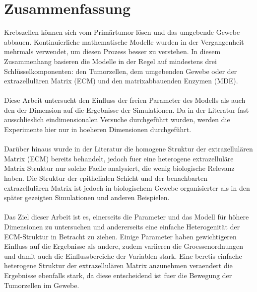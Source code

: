 \section*{Zusammenfassung}

Krebszellen können sich vom Primärtumor lösen und das umgebende Gewebe abbauen. 
Kontinuierliche mathematische Modelle wurden in der Vergangenheit mehrmals verwendet, um diesen Prozess besser zu verstehen. In diesem Zusammenhang basieren die Modelle in der Regel auf mindestens drei Schlüsselkomponenten: den Tumorzellen, dem umgebenden Gewebe oder der extrazellulären Matrix (ECM) und den matrixabbauenden Enzymen (MDE). \\ \\
Diese Arbeit untersucht den Einfluss der freien Parameter des Modells als auch den der Dimension auf die Ergebnisse der Simulationen. Da in der Literatur fast ausschlieslich eindimensionalen Versuche durchgeführt wurden, werden die Experimente hier nur in hoeheren Dimensionen durchgeführt. \\ \\
Darüber hinaus wurde in der Literatur die homogene Struktur der extrazellulären Matrix (ECM) bereits behandelt, jedoch fuer eine heterogene extrazelluläre Matrix Struktur nur solche Faelle analysiert, die wenig biologische Relevanz haben. Die Struktur der epithelialen Schicht und der benachbarten extrazellulären Matrix ist jedoch in biologischem Gewebe organisierter als in den später gezeigten Simulationen und anderen Beispielen. \\ \\
Das Ziel dieser Arbeit ist es, einerseits die Parameter und das Modell für höhere Dimensionen zu untersuchen und andererseits eine einfache Heterogenität der ECM-Struktur in Betracht zu ziehen. Einige Parameter haben gewichtigeren Einfluss auf die Ergebnisse als andere, zudem variieren die Groessenordnungen und damit auch die Einflussbereiche der Variablen stark. Eine beretis einfache heterogene Struktur der extrazellulären Matrix anzunehmen veraendert die Ergebnisse ebenfalls stark, da diese entscheidend ist fuer die Bewegung der Tumorzellen im Gewebe.

\clearpage
